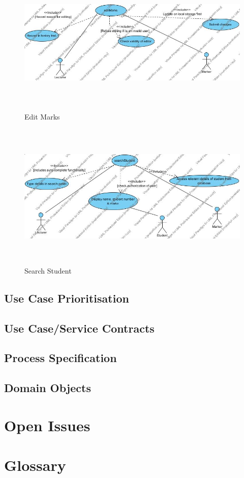 \documentclass[a4paper]{article}
\begin{document}
			\begin{figure}[h]
				\caption{Edit Marks}
				\includegraphics[height=7cm]{editMarks}
			\end{figure}
			\begin{figure}[h]
				\caption{Search Student}
				\includegraphics[height=7cm]{searchStudent}
			\end{figure}

		\subsection{Use Case Prioritisation}

		\subsection{Use Case/Service Contracts}

		\subsection{Process Specification}

		\subsection{Domain Objects}

	\section{Open Issues}

	\section{Glossary}
\end{document}
